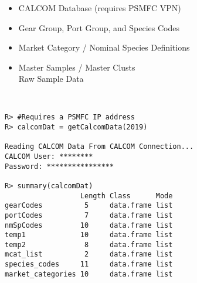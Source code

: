 \documentclass[ xcolor = pdftex, dvipsnames, table ]{beamer}
\begin{document}
%
\begin{frame}[fragile]
\begin{minipage}[h!]{0.44\textwidth}
\begin{itemize}
	\setlength\itemsep{1em}
	\item CALCOM Database (requires PSMFC VPN)
	\item Gear Group, Port Group, and Species Codes
	\item Market Category / Nominal Species Definitions
	\item Master Samples / Master Clusts\\Raw Sample Data
\end{itemize}
\end{minipage}
\begin{minipage}[h!]{0.54\textwidth}
{\scriptsize
\begin{verbatim}


R> #Requires a PSMFC IP address
R> calcomDat = getCalcomData(2019)

Reading CALCOM Data From CALCOM Connection...
CALCOM User: ********
Password: ****************

R> summary(calcomDat)
                  Length Class      Mode
gearCodes          5     data.frame list
portCodes          7     data.frame list
nmSpCodes         10     data.frame list
temp1             10     data.frame list
temp2              8     data.frame list
mcat_list          2     data.frame list
species_codes     11     data.frame list
market_categories 10     data.frame list

\end{verbatim}
}
\end{minipage}
\end{frame}

%
\begin{frame}[fragile]
\end{frame}
\end{document}
